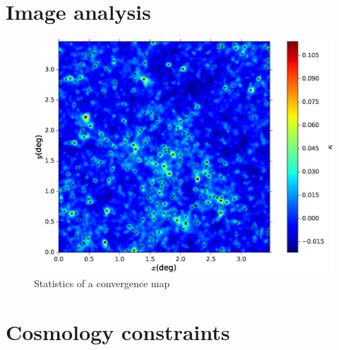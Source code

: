 \documentclass[reprint,aps,prd,superscriptaddress,showkeys,showpacs]{revtex4-1}
\begin{document}

\section{Image analysis}

\begin{figure}
\includegraphics[scale=0.4]{Figures/convergence_stats.eps}
\caption{Statistics of a convergence map}
\label{convergencefog}
\end{figure}



\section{Cosmology constraints}
\end{document}
